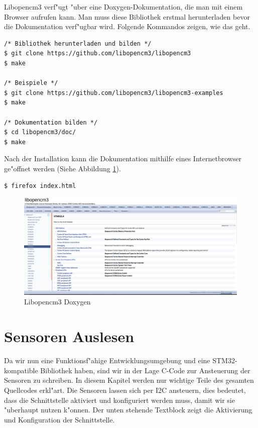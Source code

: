 Libopencm3 verf"ugt "uber eine Doxygen-Dokumentation, die man mit 
einem Browser aufrufen kann. Man muss diese Bibliothek erstmal 
herunterladen bevor die Dokumentation verf"ugbar wird. Folgende
Kommandos zeigen, wie das geht.

\vspace{5cm}

\begin{lstlisting}[frame=single]
/* Bibliothek herunterladen und bilden */
$ git clone https://github.com/libopencm3/libopencm3 
$ make

/* Beispiele */
$ git clone https://github.com/libopencm3/libopencm3-examples 
$ make

/* Dokumentation bilden */
$ cd libopencm3/doc/ 
$ make 

\end{lstlisting}

Nach der Installation kann die Dokumentation mithilfe eines 
Internetbrowser ge"offnet werden (Siehe Abbildung \ref{fig:Lib}).
\begin{lstlisting}[frame=single]
$ firefox index.html 
\end{lstlisting}

\begin{figure}[h]
	\centering
	\includegraphics[width=16cm]{source/images/Lib}
	\caption{Libopencm3 Doxygen\label{fig:Lib}}
\end{figure}

\section{Sensoren Auslesen} \label{Sensoren}

Da wir nun eine Funktionsf"ahige Entwicklungsumgebung und eine 
STM32-kompatible Bibliothek haben, sind wir in der Lage C-Code zur 
Ansteuerung der Sensoren zu schreiben. In diesem Kapitel werden nur 
wichtige Teile des gesamten Quellcodes erkl"art. Die Sensoren lassen 
sich per I2C ansteuern, dies bedeutet, dass die Schnittstelle aktiviert 
und konfiguriert werden muss, damit wir sie "uberhaupt nutzen k"onnen. 
Der unten stehende Textblock zeigt die Aktivierung und Konfiguration der Schnittstelle.

